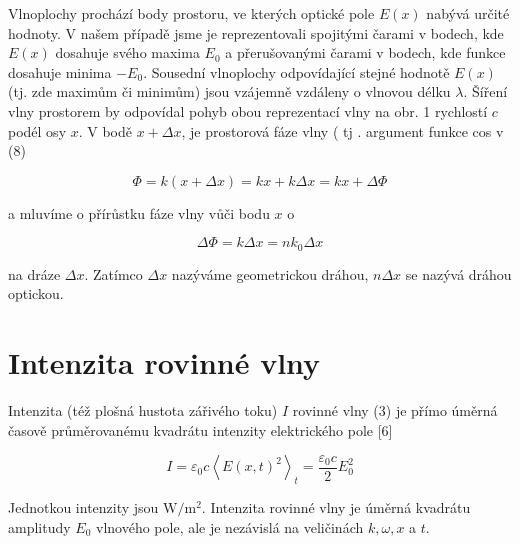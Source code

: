 \documentclass[czech,11pt,a4paper]{article}
\begin{document}
\begin{multicols}{2}
	
	
	Vlnoplochy prochází body prostoru, ve kterých optické pole $E(x)$ nabývá určité hodnoty. V našem případě jsme je reprezentovali spojitými čarami v bodech, kde $E(x)$ dosahuje svého maxima $E_{0}$ a přerušovanými čarami v bodech, kde funkce dosahuje minima $-E_{0}$. Sousední vlnoplochy odpovídající stejné hodnotě $E(x)$ (tj. zde maximům či minimům) jsou vzájemně vzdáleny o vlnovou délku $\lambda$. Šíření vlny prostorem by odpovídal pohyb obou reprezentací vlny na obr. 1 rychlostí $c$ podél osy $x$. V bodě $x+\Delta x$, je prostorová fáze vlny ( tj . argument funkce cos v (8)
	
	\begin{equation}
		\Phi=k(x+\Delta x)=k x+k \Delta x=k x+\Delta \Phi
	\end{equation}
	
	
	a mluvíme o přírůstku fáze vlny vůči bodu $x$ o
	
	\begin{equation}
		\Delta \Phi=k \Delta x=n k_{0} \Delta x
	\end{equation}
	
	
	na dráze $\Delta x$. Zatímco $\Delta x$ nazýváme geometrickou dráhou, $n \Delta x$ se nazývá dráhou optickou.
	
	\section*{Intenzita rovinné vlny}
	Intenzita (též plošná hustota zářivého toku) $I$ rovinné vlny (3) je přímo úměrná časově průměrovanému kvadrátu intenzity elektrického pole [6]
	
	\begin{equation}
		I=\varepsilon_{0} c\left\langle E(x, t)^{2}\right\rangle_{t}=\frac{\varepsilon_{0} c}{2} E_{0}^{2}
	\end{equation}
	
	
	Jednotkou intenzity jsou $\mathrm{W} / \mathrm{m}^{2}$. Intenzita rovinné vlny je úměrná kvadrátu amplitudy $E_{0}$ vlnového pole, ale je nezávislá na veličinách $k, \omega, x$ a $t$.
	

\end{multicols}
\end{document}
